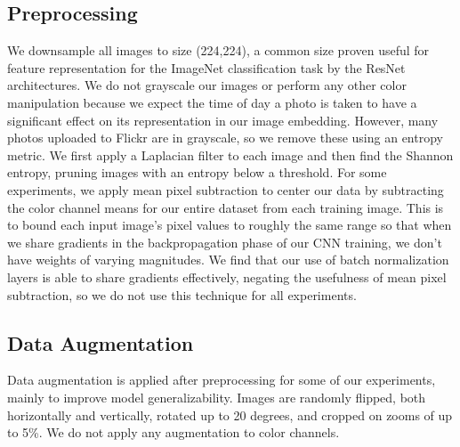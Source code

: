 

\subsection{Preprocessing}
We downsample all images to size (224,224), a common size proven useful for feature representation for the ImageNet classification task by the ResNet architectures.\cite{He2015} We do not grayscale our images or perform any other color manipulation because we expect the time of day a photo is taken to have a significant effect on its representation in our image embedding. However, many photos uploaded to Flickr are in grayscale, so we remove these using an entropy metric. We first apply a Laplacian filter to each image and then find the Shannon entropy, pruning images with an entropy below a threshold. For some experiments, we apply mean pixel subtraction to center our data by subtracting the color channel means for our entire dataset from each training image. This is to bound each input image's pixel values to roughly the same range so that when we share gradients in the backpropagation phase of our CNN training, we don't have weights of varying magnitudes. We find that our use of batch normalization layers is able to share gradients effectively, negating the usefulness of mean pixel subtraction, so we do not use this technique for all experiments.

\subsection{Data Augmentation}
Data augmentation is applied after preprocessing for some of our experiments, mainly to improve model generalizability. Images are randomly flipped, both horizontally and vertically,  rotated up to 20 degrees, and cropped on zooms of up to 5\%. We do not apply any augmentation to color channels. 

